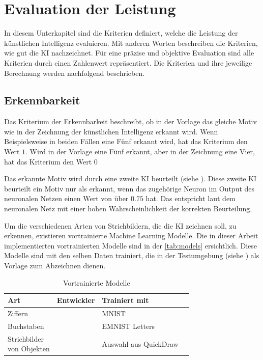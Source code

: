 \section{Evaluation der Leistung}\label{chap:m_eval}
In diesem Unterkapitel sind die Kriterien definiert, welche die Leistung der
künstlichen Intelligenz evaluieren. Mit anderen Worten beschreiben die
Kriterien, wie gut die KI nachzeichnet. Für eine präzise und objektive
Evaluation sind alle Kriterien durch einen Zahlenwert repräsentiert. Die
Kriterien und ihre jeweilige Berechnung werden nachfolgend beschrieben.

\subsection{Erkennbarkeit}\label{sub:m_eval_rec}
Das Kriterium der Erkennbarkeit beschreibt, ob in der Vorlage das gleiche Motiv
wie in der Zeichnung der künstlichen Intelligenz erkannt wird. Wenn
Beispielsweise in beiden Fällen eine Fünf erkannt wird, hat das Kriterium den
Wert $1$. Wird in der Vorlage eine Fünf erkannt, aber in der Zeichnung eine
Vier, hat das Kriterium den Wert $0$

Das erkannte Motiv wird durch eine zweite KI beurteilt (siehe
). Diese zweite KI beurteilt ein Motiv nur als erkannt,
wenn das zugehörige Neuron im Output des neuronalen Netzen einen Wert von über
$0.75$ hat. Das entspricht laut dem neuronalen Netz mit einer hohen
Wahrscheinlichkeit der korrekten Beurteilung.

Um die verschiedenen Arten von Strichbildern, die die KI zeichnen soll, zu
erkennen, existieren vortrainierte Machine Learning Modelle. Die in dieser
Arbeit implementierten vortrainierten Modelle sind in der \autoref{tab:models}
ersichtlich. Diese Modelle sind mit den selben Daten trainiert, die in der
Testumgebung (siehe ) als Vorlage zum Abzeichnen
dienen.

\begin{table}[!ht]
  \centering
  \begin{tabular}{|l|l|l|l|}
  \hline
      Art & Entwickler & Trainiert mit \\ \hline
      Ziffern & \cite{mazzia__2022} & MNIST \\ \hline
      Buchstaben & \cite{mor_emnist_2022} & EMNIST Letters \\ \hline
      \makecell{Strichbilder\\von Objekten} & \cite{lam_linus_keras_2022} & Auswahl aus QuickDraw \\ \hline
  \end{tabular}
  \caption{Vortrainierte Modelle}\label{tab:models}
\end{table}

